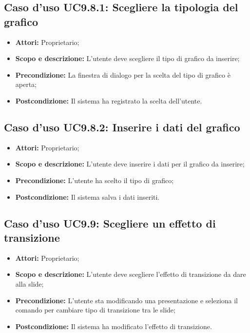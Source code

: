 	\subsection{Caso d'uso UC9.8.1: Scegliere la tipologia del grafico}
	\begin{itemize}
		\item \textbf{Attori:} Proprietario;
		\item \textbf{Scopo e descrizione:} L'utente deve scegliere il tipo di grafico da inserire;
		\item \textbf{Precondizione:} La finestra di dialogo per la scelta del tipo di grafico è aperta;
		\item \textbf{Postcondizione:} Il sistema ha registrato la scelta dell'utente.
	\end{itemize}
	
	\subsection{Caso d'uso UC9.8.2: Inserire i dati del grafico}
	\begin{itemize}
		\item \textbf{Attori:} Proprietario;
		\item \textbf{Scopo e descrizione:} L'utente deve inserire i dati per il grafico da inserire;
		\item \textbf{Precondizione:} L'utente ha scelto il tipo di grafico;
		\item \textbf{Postcondizione:} Il sistema salva i dati inseriti.
	\end{itemize}


\subsection{Caso d'uso UC9.9: Scegliere un effetto di transizione}
\begin{itemize}
	\item \textbf{Attori:} Proprietario;
	\item \textbf{Scopo e descrizione:} L'utente deve scegliere l'effetto di transizione da dare alla \gls{slide};
	\item \textbf{Precondizione:} L'utente sta modificando una presentazione e seleziona il comando per cambiare tipo di transizione tra le \gls{slide};
	\item \textbf{Postcondizione:} Il sistema ha modificato l'effetto di transizione.
\end{itemize}



